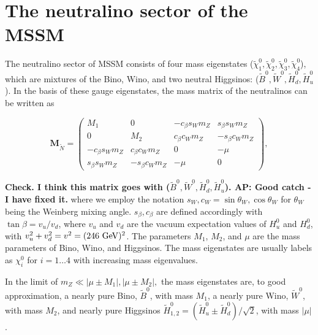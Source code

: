 \documentclass[a4paper,11pt]{article}
\newcommand{\Shufang}[1]{{\bf\color{Maroon}  #1}}
\newcommand{\Adarsh}[1]{{\bf\color{RoyalBlue} AP: #1}}
\renewcommand{\H}{\widetilde{H}^0}
\newcommand{\B}{\widetilde{B}^0}
\newcommand{\N}{\widetilde{\chi}^0}
\begin{document}
\section{The neutralino sector of the MSSM}
\label{sec:model}

 
The neutralino sector of MSSM consists of four mass eigenstates
($\N_1,\N_2,\N_3,\N_4$), which
are mixtures of the Bino, Wino, and two neutral Higgsinos: 
($\B,\widetilde{W}^0,\H_d,\H_u$). In the basis of these gauge eigenstates, the mass
matrix of the neutralinos can be written as

\newcommand{\cb}{ c_\beta}
\newcommand{\cw}{ c_W}
\newcommand{\sinb}{ s_\beta}
\newcommand{\sw}{ s_W}
\newcommand{\mz}{ m_Z}

\[\mathbf{M}_{\widetilde{N}}=
\begin{pmatrix}
  M_1 & 0 & -\cb\sw\mz & \sinb\sw\mz \\
  0 & M_2 & \cb\cw\mz & -\sinb\cw\mz \\
  -\cb\sw\mz & \cb\cw\mz & 0 & -\mu \\
  \sinb\sw\mz & -\sinb\cw\mz & -\mu & 0
\end{pmatrix},\]

\Shufang{Check.  I think this matrix goes with
($\B,\widetilde{W}^0,\H_d,\H_u$). \Adarsh{Good catch - I have fixed it.}}
\noindent where we employ the notation $s_W, c_W = \sin\theta_W, \cos\theta_W$
for $\theta_W$ being the Weinberg mixing angle. $s_\beta, c_\beta$ are defined
accordingly with $\tan\beta= v_u/v_d$, where $v_u$ and $v_d$ are the vacuum
expectation values of $H_u^0$ and $H_d^0$, with $v_u^2+v_d^2=v^2=(246\ {\rm
GeV})^2$. The parameters $M_1$, $M_2$, and $\mu$ are the mass parameters of
Bino, Wino, and Higgsinos.  The mass eigenstates are usually labels as
$\chi_i^0$ for $i=1 \ldots 4$ with increasing mass eigenvalues.

In the limit of $\mz \ll |\mu\pm M_1|, |\mu\pm M_2|,$ the mass eigenstates
are, to good approximation, a nearly pure Bino, $\B$, with mass $M_1$,
a nearly pure Wino, $\widetilde{W}^0$, with mass $M_2$, and nearly pure Higgsinos
$\H_{1,2} = (\H_u \pm \H_d)/\sqrt{2}$, with mass
$|\mu|$. 
\end{document}
